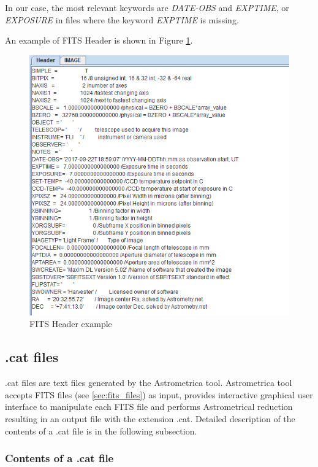 	 In our case, the most relevant keywords are \emph{DATE-OBS} and \emph{EXPTIME}, or \emph{EXPOSURE} in files where the keyword \emph{EXPTIME} is missing.
	 
	 An example of FITS Header is shown in Figure \ref{fig:fits_header}.
	
	\begin{figure}[H]
	\centering
	  \includegraphics[scale=0.644]{images/fits_header_example}
		  \caption{FITS Header example}
	  \label{fig:fits_header}
	\end{figure}

\subsection{.cat files}\label{sec:cat_files}
	
	.cat files are text files generated by the Astrometrica tool. Astrometrica tool accepts FITS files (see \ref{sec:fits_files}) as input, provides interactive graphical user interface to manipulate each FITS file and performs Astrometrical reduction resulting in an output file with the extension .cat. Detailed description of the contents of a .cat file is in the following subsection.
	
\subsubsection{Contents of a .cat file}\label{subsubsec:content_cat}
	
